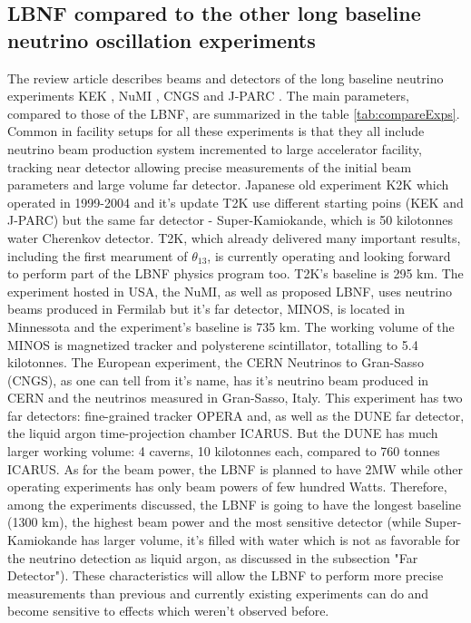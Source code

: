 \subsection{LBNF compared to the other long baseline neutrino oscillation experiments}
The review article \cite{ref_LBN_OscExpReview} describes beams and detectors of the long baseline neutrino experiments KEK \cite{ref_KEK}, NuMI \cite{ref_NuMI}, CNGS \cite{ref_CNGS} and J-PARC \cite{ref_JPARC}. The main parameters, compared to those of the LBNF, are summarized in the table \ref{tab:compareExps}. Common in facility setups for all these experiments is that they all include neutrino beam production system incremented to large accelerator facility, tracking near detector allowing precise measurements of the initial beam parameters and large volume far detector. Japanese old experiment K2K which operated in 1999-2004 and it's update T2K use different starting poins (KEK and J-PARC) but the same far detector - Super-Kamiokande, which is 50 kilotonnes water Cherenkov detector. T2K, which already delivered many important results, including the first mearument of $\theta_{13}$, is currently operating and looking forward to perform part of the LBNF physics program too. T2K's baseline is 295 km. The experiment hosted in USA, the NuMI, as well as proposed LBNF, uses neutrino beams produced in Fermilab but it's far detector, MINOS, is located in Minnessota and the experiment's baseline is 735 km. The working volume of the MINOS is magnetized tracker and polysterene scintillator, totalling to 5.4 kilotonnes. The European experiment, the CERN Neutrinos to Gran-Sasso (CNGS), as one can tell from it's name, has it's neutrino beam produced in CERN and the neutrinos measured in Gran-Sasso, Italy. This experiment has two far detectors: fine-grained tracker OPERA and, as well as the DUNE far detector, the liquid argon time-projection chamber ICARUS. But the DUNE has much larger working volume: 4 caverns, 10 kilotonnes each, compared to 760 tonnes ICARUS. As for the beam power, the LBNF is planned to have 2MW while other operating experiments has only beam powers of few hundred Watts. Therefore, among the experiments discussed, the LBNF is going to have the longest baseline (1300 km), the highest beam power and the most sensitive detector (while Super-Kamiokande has larger volume, it's filled with water which is not as favorable for the neutrino detection as liquid argon, as discussed in the subsection "Far Detector"). These characteristics will allow the LBNF to perform more precise measurements than previous and currently existing experiments can do and become sensitive to effects which weren't observed before.

